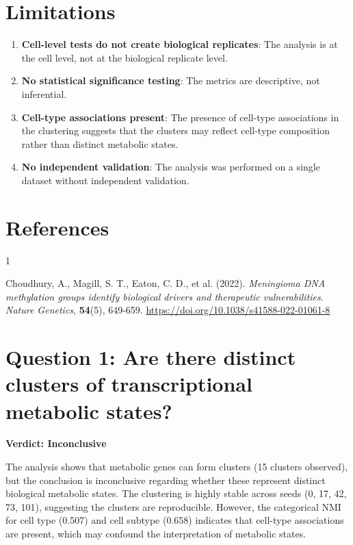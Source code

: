 \documentclass[11pt, a4paper]{article}
\begin{document}
\section{Limitations}

\begin{enumerate}
    \item \textbf{Cell-level tests do not create biological replicates}: The analysis is at the cell level, not at the biological replicate level.
    \item \textbf{No statistical significance testing}: The metrics are descriptive, not inferential.
    \item \textbf{Cell-type associations present}: The presence of cell-type associations in the clustering suggests that the clusters may reflect cell-type composition rather than distinct metabolic states.
    \item \textbf{No independent validation}: The analysis was performed on a single dataset without independent validation.
\end{enumerate}

\section{References}

\begin{thebibliography}{1}

Choudhury, A., Magill, S. T., Eaton, C. D., et al. (2022). \textit{Meningioma DNA methylation groups identify biological drivers and therapeutic vulnerabilities}. \textit{Nature Genetics}, \textbf{54}(5), 649-659. \url{https://doi.org/10.1038/s41588-022-01061-8}

\end{thebibliography}

\section{Question 1: Are there distinct clusters of transcriptional metabolic states?}

\textbf{Verdict: Inconclusive}

The analysis shows that metabolic genes can form clusters (15 clusters observed), but the conclusion is inconclusive regarding whether these represent distinct biological metabolic states. The clustering is highly stable across seeds (0, 17, 42, 73, 101), suggesting the clusters are reproducible. However, the categorical NMI for cell type (0.507) and cell subtype (0.658) indicates that cell-type associations are present, which may confound the interpretation of metabolic states.
\end{document}
